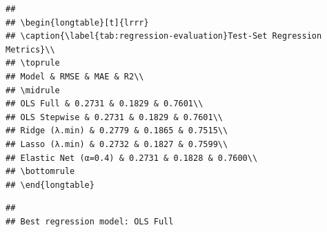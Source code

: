 \documentclass[
]{article}
\newenvironment{Shaded}{\begin{snugshade}}{\end{snugshade}}
\newcommand{\CommentTok}[1]{\textcolor[rgb]{0.56,0.35,0.01}{\textit{#1}}}
\newcommand{\FunctionTok}[1]{\textcolor[rgb]{0.13,0.29,0.53}{\textbf{#1}}}
\newcommand{\NormalTok}[1]{#1}
\newcommand{\OtherTok}[1]{\textcolor[rgb]{0.56,0.35,0.01}{#1}}
\newcommand{\SpecialCharTok}[1]{\textcolor[rgb]{0.81,0.36,0.00}{\textbf{#1}}}
\newcommand{\StringTok}[1]{\textcolor[rgb]{0.31,0.60,0.02}{#1}}
\begin{document}
\begin{verbatim}
## 
## \begin{longtable}[t]{lrrr}
## \caption{\label{tab:regression-evaluation}Test-Set Regression Metrics}\\
## \toprule
## Model & RMSE & MAE & R2\\
## \midrule
## OLS Full & 0.2731 & 0.1829 & 0.7601\\
## OLS Stepwise & 0.2731 & 0.1829 & 0.7601\\
## Ridge (λ.min) & 0.2779 & 0.1865 & 0.7515\\
## Lasso (λ.min) & 0.2732 & 0.1827 & 0.7599\\
## Elastic Net (α=0.4) & 0.2731 & 0.1828 & 0.7600\\
## \bottomrule
## \end{longtable}
\end{verbatim}

\begin{Shaded}
\end{Shaded}

\begin{verbatim}
## 
## Best regression model: OLS Full
\end{verbatim}
\end{document}

